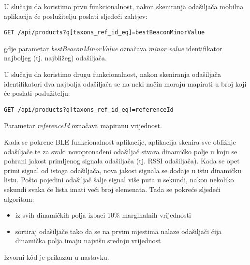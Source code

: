 U slučaju da koristimo prvu funkcionalnost, nakon skeniranja odašiljača mobilna aplikacija će poslužitelju poslati sljedeći zahtjev:
\begin{lstlisting}
GET /api/products?q[taxons_ref_id_eq]=bestBeaconMinorValue
\end{lstlisting}
gdje parametar \textit{bestBeaconMinorValue} označava \textit{minor value} identifikator najboljeg (tj. najbližeg) odašiljača.

U slučaju da koristimo drugu funkcionalnost, nakon skeniranja odašiljača identifikatori dva najbolja odašiljača se na neki način moraju mapirati u broj koji će poslati poslužitelju:
\begin{lstlisting}
GET /api/products?q[taxons_ref_id_eq]=referenceId
\end{lstlisting}
Parametar \textit{referenceId} označava mapiranu vrijednost.

Kada se pokrene BLE funkcionalnost aplikacije, aplikacija skenira sve obližnje odašiljače te za svaki novopronađeni odašiljač stvara dinamičko polje u koju se pohrani jakost primljenog signala odašiljača (tj. RSSI odašiljača). 
Kada se opet primi signal od istoga odašiljača, nova jakost signala se dodaje u istu dinamičku listu. 
Pošto pojedini odašiljač šalje signal više puta u sekundi, nakon nekoliko sekundi svaka će lista imati veći broj elemenata.
Tada se pokreće sljedeći algoritam:
\begin{itemize}
    \item iz svih dinamičkih polja izbaci 10\% marginalnih vrijednosti
    \item sortiraj odašiljače tako da se na prvim mjestima nalaze odašiljači čija dinamička polja imaju najvišu srednju vrijednost
\end{itemize}
Izvorni kôd je prikazan u nastavku.


